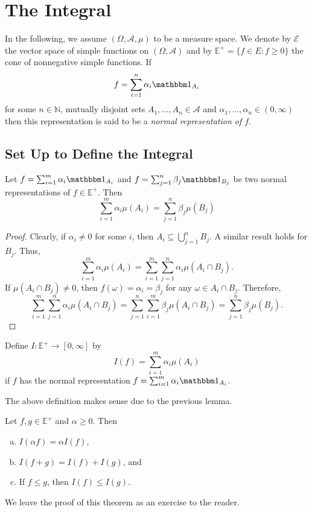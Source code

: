 \section{The Integral}

In the following, we assume $(\Omega,\mathcal{A},\mu)$ to be a measure space. We denote by $\mathcal{E}$ the vector space of simple functions on $(\Omega,\mathcal{A})$ and by $\mathbb{E}^+=\{f\in E:f\geq 0\}$ the cone of nonnegative simple functions. If
$$f=\sum_{i=1}^n \alpha_i\indic_{A_i}$$
for some $n\in\mathbb{N}$, mutually disjoint sets $A_1,\ldots,A_n\in\mathcal{A}$ and $\alpha_1,\ldots,\alpha_n\in(0,\infty)$ then this representation is said to be a \textit{normal representation of $f$}.

\subsection{Set Up to Define the Integral}

\begin{lemma}
    Let $f=\sum_{i=1}^m\alpha_i\indic_{A_i}$ and $f=\sum_{j=1}^n\beta_j\indic_{B_j}$ be two normal representations of $f\in\mathbb{E}^+$. Then
    $$\sum_{i=1}^m\alpha_i\mu(A_i)=\sum_{j=1}^n\beta_j\mu(B_j)$$
\end{lemma}
\begin{proof}
    Clearly, if $\alpha_i\neq 0$ for some $i$, then $A_i\subseteq\bigcup_{j=1}^n B_j$. A similar result holds for $B_j$. Thus,
    $$\sum_{i=1}^m\alpha_i\mu(A_i) = \sum_{i=1}^m\sum_{j=1}^n\alpha_i\mu(A_i\cap B_j).$$
    If $\mu(A_i\cap B_j)\neq 0$, then $f(\omega)=\alpha_i=\beta_j$ for any $\omega\in A_i\cap B_j$. Therefore,
    $$\sum_{i=1}^m\sum_{j=1}^n\alpha_i\mu(A_i\cap B_j) = \sum_{j=1}^n\sum_{i=1}^m\beta_j\mu(A_i\cap B_j) = \sum_{j=1}^n\beta_j\mu(B_j).$$
\end{proof}

\begin{definition}
    Define $I:\mathbb{E}^+\to[0,\infty]$ by
    $$I(f) = \sum_{i=1}^m\alpha_i\mu(A_i)$$
    if $f$ has the normal representation $f=\sum_{i=1}^m\alpha_i\indic_{A_i}$.
\end{definition}
The above definition makes sense due to the previous lemma.

\begin{lemma}
\label{properties Of I for simple}
    Let $f,g\in\mathbb{E}^+$ and $\alpha\geq 0$. Then
    \begin{enumerate}[(a)]
        \item $I(\alpha f)=\alpha I(f)$,
        \item $I(f+g)=I(f)+I(g)$, and
        \item If $f\leq g$, then $I(f)\leq I(g)$.
    \end{enumerate}
\end{lemma}
We leave the proof of this theorem as an exercise to the reader.

